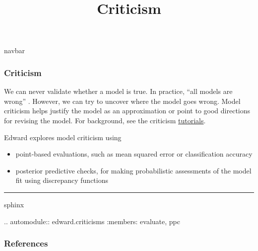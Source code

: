 \title{Criticism}

{{navbar}}

\subsubsection{Criticism}

We can never validate whether a model is true. In practice, ``all
models are wrong'' \citep{box1976science}. However, we can try to
uncover where the model goes wrong. Model criticism helps justify the
model as an approximation or point to good directions for revising the
model.
For background, see the criticism \href{/tutorials/}{tutorials}.

Edward explores model criticism using
\begin{itemize}
  \item point-based evaluations, such as mean squared error or
  classification accuracy
  \item posterior predictive checks, for making probabilistic
  assessments of the model fit using discrepancy functions
\end{itemize}





\begin{center}\rule{3in}{0.4pt}\end{center}

{{sphinx

.. automodule:: edward.criticisms
   :members: evaluate,
             ppc

}}

\subsubsection{References}\label{references}
